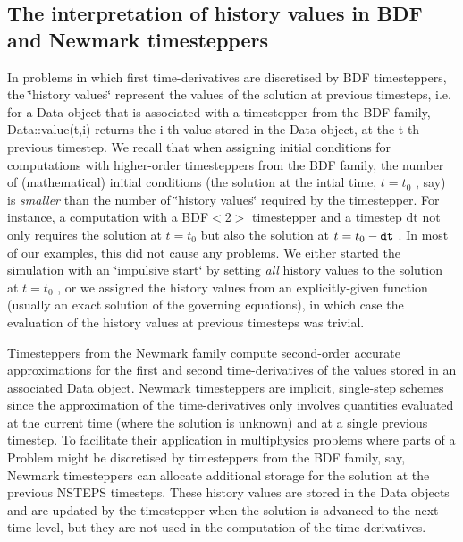 \hypertarget{index_BDFvsNewmark}{}\subsection{The interpretation of history values in B\+D\+F and Newmark timesteppers}\label{index_BDFvsNewmark}
In problems in which first time-\/derivatives are discretised by {\ttfamily B\+DF} timesteppers, the \char`\"{}history values\char`\"{} represent the values of the solution at previous timesteps, i.\+e. for a {\ttfamily Data} object that is associated with a timestepper from the {\ttfamily B\+DF} family, {\ttfamily Data\+::value(t,i)} returns the i-\/th value stored in the {\ttfamily Data} object, at the t-\/th previous timestep. We recall that when assigning initial conditions for computations with higher-\/order timesteppers from the {\ttfamily B\+DF} family, the number of (mathematical) initial conditions (the solution at the intial time, $ t=t_0 $ , say) is {\itshape smaller} than the number of \char`\"{}history values\char`\"{} required by the timestepper. For instance, a computation with a {\ttfamily B\+D\+F$<$2$>$} timestepper and a timestep {\ttfamily dt} not only requires the solution at $ t=t_0 $ but also the solution at $ t=t_0- {\tt dt} $ . In most of our examples, this did not cause any problems. We either started the simulation with an \char`\"{}impulsive start\char`\"{} by setting {\itshape all} history values to the solution at $ t=t_0 $ , or we assigned the history values from an explicitly-\/given function (usually an exact solution of the governing equations), in which case the evaluation of the history values at previous timesteps was trivial.

Timesteppers from the {\ttfamily Newmark} family compute second-\/order accurate approximations for the first and second time-\/derivatives of the values stored in an associated {\ttfamily Data} object. {\ttfamily Newmark} timesteppers are implicit, single-\/step schemes since the approximation of the time-\/derivatives only involves quantities evaluated at the current time (where the solution is unknown) and at a single previous timestep. To facilitate their application in multiphysics problems where parts of a {\ttfamily Problem} might be discretised by timesteppers from the {\ttfamily B\+DF} family, say, {\ttfamily Newmark} timesteppers can allocate additional storage for the solution at the previous {\ttfamily N\+S\+T\+E\+PS} timesteps. These history values are stored in the {\ttfamily Data} objects and are updated by the timestepper when the solution is advanced to the next time level, but they are not used in the computation of the time-\/derivatives.

